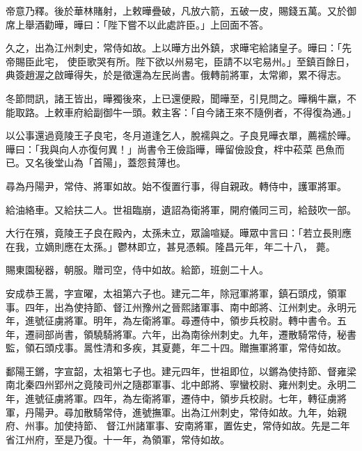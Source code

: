 \begin{pinyinscope}
 帝意乃釋。後於華林賭射，上敕曄疊破，凡放六箭，五破一皮，賜錢五萬。又於御席上舉酒勸曄，曄曰：「陛下嘗不以此處許臣。」上回面不答。



 久之，出為江州刺史，常侍如故。上以曄方出外鎮，求曄宅給諸皇子。曄曰：「先帝賜臣此宅，
 使臣歌哭有所。陛下欲以州易宅，臣請不以宅易州。」至鎮百餘日，典簽趙渥之啟曄得失，於是徵還為左民尚書。俄轉前將軍，太常卿，累不得志。



 冬節問訊，諸王皆出，曄獨後來，上已還便殿，聞曄至，引見問之。曄稱牛羸，不能取路。上敕車府給副御牛一頭。敕主客：「自今諸王來不隨例者，不得復為通。」



 以公事還過竟陵王子良宅，冬月道逢乞人，脫襦與之。子良見曄衣單，薦襦於曄。曄曰：「我與向人亦復何異！」尚書令王儉詣曄，曄留儉設食，柈中菘菜邑魚而已。又名後堂山為「首陽」，蓋怨貧薄也。



 尋為丹陽尹，常侍、將軍如故。始不復置行事，得自親政。轉侍中，護軍將軍。



 給油絡車。又給扶二人。世祖臨崩，遺詔為衛將軍，開府儀同三司，給鼓吹一部。



 大行在殯，竟陵王子良在殿內，太孫未立，眾論喧疑。曄眾中言曰：「若立長則應在我，立嫡則應在太孫。」鬱林即立，甚見憑賴。隆昌元年，年二十八，
 薨。



 賜東園秘器，朝服。贈司空，侍中如故。給節，班劍二十人。



 安成恭王暠，字宣曜，太祖第六子也。建元二年，除冠軍將軍，鎮石頭戍，領軍事。四年，出為使持節、督江州豫州之晉熙諸軍事、南中郎將、江州刺史。永明元年，進號征虜將軍。明年，為左衛將軍。尋遷侍中，領步兵校尉。轉中書令。五年，遷祠部尚書，領驍騎將軍。六年，出為南徐州刺史。九年，遷散騎常侍，秘書監，領石頭戍事。暠性清和多疾，其夏薨，年二十四。贈撫軍將軍，常侍如故。



 鄱陽王鏘，字宣韶，太祖第七子也。建元四年，世祖即位，以鏘為使持節、督雍梁南北秦四州郢州之竟陵司州之隨郡軍事、北中郎將、寧蠻校尉、雍州刺史。永明二年，進號征虜將軍。四年，為左衛將軍，遷侍中，領步兵校尉。七年，轉征虜將軍，丹陽尹。尋加散騎常侍，進號撫軍。出為江州刺史，常侍如故。九年，始親府、州事。加使持節、
 督江州諸軍事、安南將軍，置佐史，常侍如故。先是二年省江州府，至是乃復。十一年，為領軍，常侍如故。




\end{pinyinscope}
